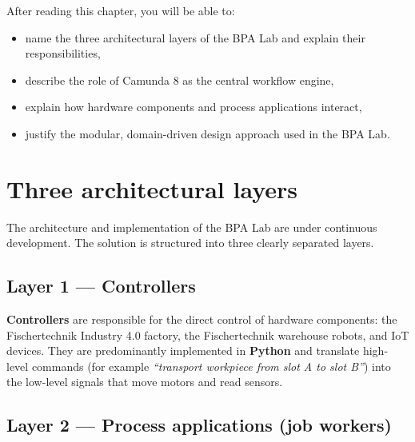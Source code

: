 \documentclass[
  english,
  11pt,
  a4paper,
]{scrbook}
\providecommand{\tightlist}{%
  \setlength{\itemsep}{0pt}\setlength{\parskip}{0pt}}
\begin{document}
\begin{tcolorbox}[enhanced jigsaw, arc=.35mm, bottomrule=.15mm, bottomtitle=1mm, breakable, colback=white, colbacktitle=quarto-callout-note-color!10!white, colframe=quarto-callout-note-color-frame, coltitle=black, left=2mm, leftrule=.75mm, opacityback=0, opacitybacktitle=0.6, rightrule=.15mm, title=\textcolor{quarto-callout-note-color}{\faInfo}\hspace{0.5em}{Learning objectives}, titlerule=0mm, toprule=.15mm, toptitle=1mm]

After reading this chapter, you will be able to:

\begin{itemize}
\tightlist
\item
  name the three architectural layers of the BPA Lab and explain their
  responsibilities,
\item
  describe the role of Camunda 8 as the central workflow engine,
\item
  explain how hardware components and process applications interact,
\item
  justify the modular, domain-driven design approach used in the BPA
  Lab.
\end{itemize}

\end{tcolorbox}

\section{Three architectural layers}\label{three-architectural-layers}

The architecture and implementation of the BPA Lab are under continuous
development. The solution is structured into three clearly separated
layers.

\subsection{Layer 1 --- Controllers}\label{layer-1-controllers}

\textbf{Controllers} are responsible for the direct control of hardware
components: the Fischertechnik Industry 4.0 factory, the Fischertechnik
warehouse robots, and IoT devices. They are predominantly implemented in
\textbf{Python} and translate high-level commands (for example
\emph{``transport workpiece from slot A to slot B''}) into the low-level
signals that move motors and read sensors.

\subsection{Layer 2 --- Process applications (job
workers)}\label{layer-2-process-applications-job-workers}
\end{document}
